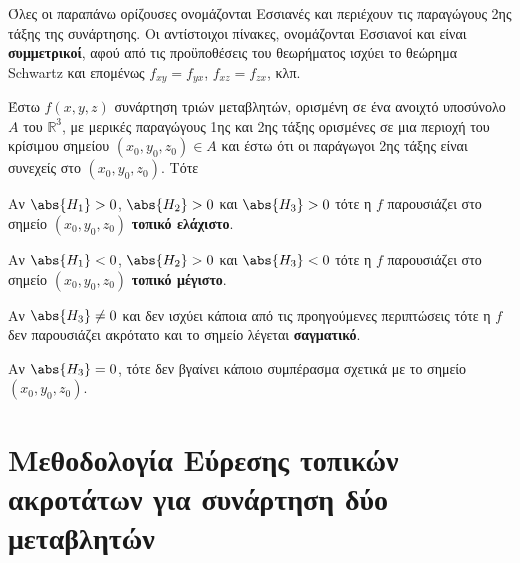 \documentclass[a4paper,table]{report}
\begin{document}
\begin{rem}
  Όλες οι παραπάνω ορίζουσες ονομάζονται \textcolor{Col1}{Εσσιανές} και περιέχουν τις 
  παραγώγους 2ης τάξης της συνάρτησης. Οι αντίστοιχοι πίνακες, ονομάζονται 
  \textcolor{Col1}{Εσσιανοί} 
  και είναι \textbf{συμμετρικοί}, αφού από τις προϋποθέσεις του θεωρήματος ισχύει το 
  θεώρημα Schwartz και επομένως $ f_{xy} = f_{yx} $, $ f_{xz} = f_{zx} $, κλπ.
\end{rem}


\begin{mybox2}
\begin{thm}
  \label{thm:3var}
\item {}
  Έστω $ f(x,y,z) $ συνάρτηση τριών μεταβλητών, ορισμένη σε ένα ανοιχτό 
  υποσύνολο $A$ του $ \mathbb{R}^{3} $, με μερικές παραγώγους 1ης και 2ης τάξης 
  ορισμένες σε μια  περιοχή του κρίσιμου σημείου $ (x_{0}, y_{0}, z_{0}) \in A $ και 
  έστω ότι οι παράγωγοι 2ης τάξης είναι συνεχείς στο $ (x_{0}, y_{0}, z_{0}) $. Τότε
\end{thm}

\begin{myitemize}
  \item Αν $ \abs{H_{1}} > 0 $, $ \abs{H_{2}} > 0 $ και $ \abs{H_{3}} > 0 $ 
    τότε η $f$ παρουσιάζει στο σημείο $ (x_{0}, y_{0}, z_{0}) $ \textbf{τοπικό ελάχιστο}.
  \item Αν $ \abs{H_{1}} < 0 $, $ \abs{H_{2}} > 0 $ και $ \abs{H_{3}} < 0 $ 
    τότε η $f$ παρουσιάζει στο σημείο $ (x_{0}, y_{0}, z_{0}) $ \textbf{τοπικό
    μέγιστο}.
  \item Αν $ \abs{H_{3}} \neq 0 $ και δεν ισχύει κάποια 
    από τις προηγούμενες περιπτώσεις τότε η $f$ δεν παρουσιάζει ακρότατο και το 
    σημείο λέγεται \textbf{σαγματικό}.
  \item Αν $ \abs{H_{3}} = 0 $, τότε δεν βγαίνει κάποιο συμπέρασμα σχετικά με το 
    σημείο $ (x_{0}, y_{0}, z_{0}) $.
\end{myitemize}
\end{mybox2}


\section{Μεθοδολογία Εύρεσης τοπικών ακροτάτων για συνάρτηση δύο μεταβλητών}
\end{document}
